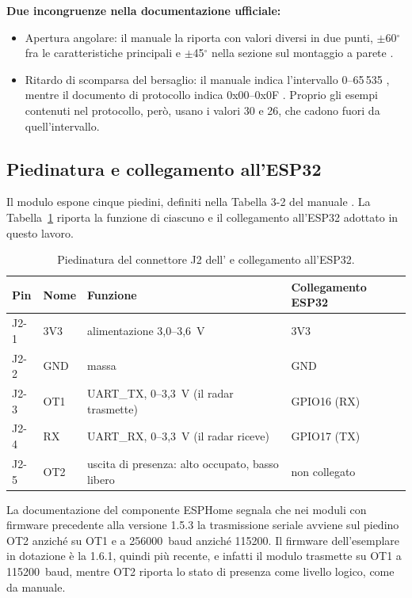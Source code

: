 \textbf{Due incongruenze nella documentazione ufficiale:}

\begin{itemize}
  \item Apertura angolare: il manuale la riporta con valori diversi in due punti, \(\pm\)60\(^\circ\) fra le caratteristiche principali e \(\pm\)45\(^\circ\) nella sezione sul montaggio a parete \cite[§1.1 e §5.2]{hilinkManualLD2420}.
  \item Ritardo di scomparsa del bersaglio: il manuale indica l’intervallo 0--65\,535 \cite[§4.2.1]{hilinkManualLD2420}, mentre il documento di protocollo indica 0x00–0x0F \cite[Tab. 2]{hilinkProtoLD2420}. Proprio gli esempi contenuti nel protocollo, però, usano i valori 30 e 26, che cadono fuori da quell'intervallo.
\end{itemize}

\subsection{Piedinatura e collegamento all'ESP32}
\label{sec:c3-2-2}

Il modulo espone cinque piedini, definiti nella Tabella 3-2 del manuale \cite{hilinkManualLD2420}. La Tabella~\ref{tab:c3-8} riporta la funzione di ciascuno e il collegamento all'ESP32 adottato in questo lavoro.

\begin{table}[!htb]
\centering
\caption{Piedinatura del connettore J2 dell'\ldc{} \cite[Tab. 3-2]{hilinkManualLD2420} e collegamento all'ESP32.}
\label{tab:c3-8}
\small
\begin{tabularx}{\linewidth}{@{}llXl@{}}
\toprule
\textbf{Pin} & \textbf{Nome} & \textbf{Funzione} & \textbf{Collegamento ESP32} \\
\midrule
J2-1 & 3V3 & alimentazione 3,0–3,6~V & 3V3 \\
J2-2 & GND & massa & GND \\
J2-3 & OT1 & UART\_TX, 0–3,3~V (il radar trasmette) & GPIO16 (RX) \\
J2-4 & RX & UART\_RX, 0–3,3~V (il radar riceve) & GPIO17 (TX) \\
J2-5 & OT2 & uscita di presenza: alto occupato, basso libero & non collegato \\
\bottomrule
\end{tabularx}
\end{table}

La documentazione del componente ESPHome \cite{esphomeLD2420} segnala che nei moduli con firmware precedente alla versione 1.5.3 la trasmissione seriale avviene sul piedino OT2 anziché su OT1 e a 256000~baud anziché 115200. Il firmware dell'esemplare in dotazione è la 1.6.1, quindi più recente, e infatti il modulo trasmette su OT1 a 115200~baud, mentre OT2 riporta lo stato di presenza come livello logico, come da manuale.

